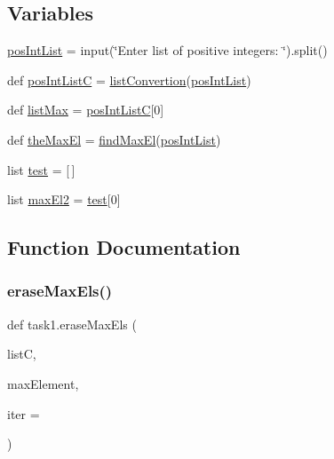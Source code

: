 \subsection*{Variables}
\begin{DoxyCompactItemize}
\item 
\hyperlink{namespacetask1_aeb30bab29edc92a3d32f397950d9ac2b}{pos\+Int\+List} = input(\char`\"{}Enter list of positive integers\+: \char`\"{}).split()
\item 
def \hyperlink{namespacetask1_a6cabdd323ac8029987571a816c6f89a4}{pos\+Int\+ListC} = \hyperlink{namespacetask1_a417fc33e3a3db579a8e974cbd8b80978}{list\+Convertion}(\hyperlink{namespacetask1_aeb30bab29edc92a3d32f397950d9ac2b}{pos\+Int\+List})
\item 
def \hyperlink{namespacetask1_a228980e4354a16d91583cc8b23e2405c}{list\+Max} = \hyperlink{namespacetask1_a6cabdd323ac8029987571a816c6f89a4}{pos\+Int\+ListC}\mbox{[}0\mbox{]}
\item 
def \hyperlink{namespacetask1_a1910c961e91aa15b50a9d7210903d5c4}{the\+Max\+El} = \hyperlink{namespacetask1_ab5289f16454d53dc123bcdaa993b8f34}{find\+Max\+El}(\hyperlink{namespacetask1_aeb30bab29edc92a3d32f397950d9ac2b}{pos\+Int\+List})
\item 
list \hyperlink{namespacetask1_af2a600c0c28c511d63f0e583147ca4a3}{test} = \mbox{[}$\,$\mbox{]}
\item 
list \hyperlink{namespacetask1_acbed649192dd192650314ae9d72dc371}{max\+El2} = \hyperlink{namespacetask1_af2a600c0c28c511d63f0e583147ca4a3}{test}\mbox{[}0\mbox{]}
\end{DoxyCompactItemize}


\subsection{Function Documentation}
\mbox{\label{namespacetask1_ac3ea594388e8ff9b77bd1995bf070998}} 
\subsubsection{\texorpdfstring{erase\+Max\+Els()}{eraseMaxEls()}}
{\footnotesize\ttfamily def task1.\+erase\+Max\+Els (\begin{DoxyParamCaption}\item[{}]{listC,  }\item[{}]{max\+Element,  }\item[{}]{iter = {} }\end{DoxyParamCaption})}



